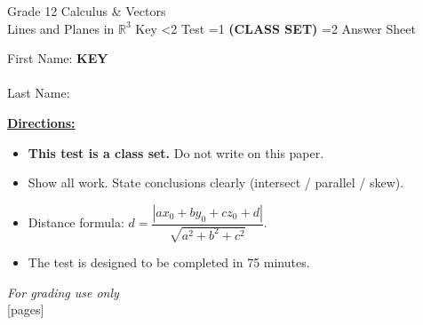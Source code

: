 \documentclass[addpoints]{exam}
\newcommand{\event}{Lines and Planes in $\mathbb{R}^3$}
\newcommand{\tournament}{}
\def\type{0}
\begin{document}
\begin{center}
    {\huge Grade 12 Calculus \& Vectors \\ \event
    \ifprintanswers \space Key
    \else \space \ifnum\type<2 Test \fi \ifnum\type=1 \textbf{(CLASS SET)} \fi
          \ifnum\type=2 Answer Sheet \fi
    \fi \\ \vspace{3mm}\tournament\vspace{1mm}}
\end{center}

\vspace{.25\textheight}

\begin{center}
    First Name: \ifprintanswers
    \underline{\hspace{3.5cm}}\textbf{KEY}\underline{\hspace{5.5cm}}\\\vspace{5mm}
    \else \underline{\hspace{10cm}}\\ \vspace{5mm} \fi
    Last Name: \underline{\hspace{10cm}}\\ \vspace{5mm}
\end{center}

\noindent\textbf{\underline{Directions:}}
\begin{itemize}
    \ifnum\type=1 \item \textbf{This test is a class set.} Do not write on this paper. \fi
    \item Show all work. State conclusions clearly (intersect / parallel / skew).
    \item Distance formula: $d = \dfrac{|ax_0 + by_0 + cz_0 + d|}{\sqrt{a^2+b^2+c^2}}$.
    \item The test is designed to be completed in 75 minutes.
\end{itemize}
\begin{center}
\textit{For grading use only}\\
[pages]
\end{center}
\end{document}
